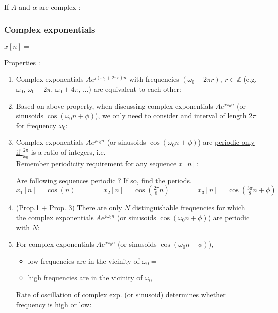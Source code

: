 \documentclass[10pt,a4paper,report]{report}       %
\newcommand{\om}{\omega}
\begin{document}
If $A$ and $\alpha$ are complex :
\vspace{8cm}

\subsubsection{Complex exponentials}
\begin{center}
$x[n]=\qquad \qquad \qquad \qquad$\\
\end{center}

Properties :
\begin{enumerate}
  \item Complex exponentials $Ae^{j(\om_0+2\pi r)n}$ with frequencies $(\om_0 + 2\pi r), ~r\in \mathbb{Z}$ (e.g. $\om_0$, $\om_0+2\pi$, $\om_0+4\pi$, ...) are equivalent to each other:\vspace{2cm}
  
  \item Based on above property, when discussing complex exponentials $Ae^{j\om_0n}$ (or sinusoids $\cos(\om_0n+\phi)$), we only need to consider and interval of length $2\pi$ for frequency $\om_0$:\vspace{2cm}
  
  \item Complex exponentials $Ae^{j\om_0n}$ (or sinusoids $\cos(\om_0n+\phi)$) are \underline{periodic only if } $\frac{2\pi}{\om_0}$ is a ratio of integers, i.e. \\
  \vspace{0.5cm} 
  Remember periodicity requirement for any sequence $x[n]$:\\
  \vspace{4cm}
  
  \ex Are following sequences periodic ? If so, find the periods.\\
  $x_1[n]=\cos(n) \qquad \qquad x_2[n]=\cos(\frac{2\pi}{8}n) \qquad \qquad x_3[n]=\cos(\frac{3\pi}{8}n+\phi)$
  \vspace{6cm}
  
  \item (Prop.1 + Prop. 3) There are only $N$ distinguishable frequencies for which the complex exponentials $Ae^{j\om_0n}$ (or sinusoids $\cos(\om_0n+\phi)$) are periodic with $N$: \vspace{4cm}
  
  \item For complex exponentials $Ae^{j\om_0n}$ (or sinusoids $\cos(\om_0n+\phi)$), 
  \begin{itemize}
    \item low frequencies are in the vicinity of $\om_0=$ 
    \item high frequencies are in the vicinity of $\om_0=$
  \end{itemize}
  \vspace{3cm}
  Rate of oscillation of complex exp. (or sinusoid) determines whether frequency is high or low:
  \begin{figure}[h]
  \end{figure}
  
\end{enumerate}
\end{document}
